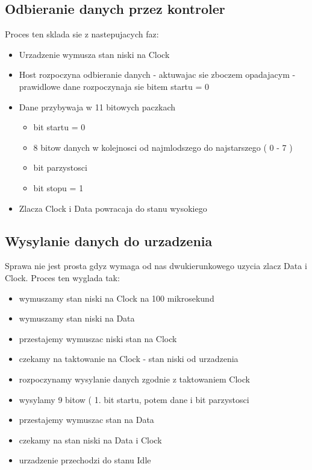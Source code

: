 \documentclass{article}
\begin{document}
	\subsection{Odbieranie danych przez kontroler}
		Proces ten sklada sie z nastepujacych faz:
		\begin{itemize}
			\item{Urzadzenie wymusza stan niski na Clock}
			\item{Host rozpoczyna odbieranie danych - aktuwajac sie zboczem opadajacym} - prawidlowe dane rozpoczynaja sie bitem startu = 0
			\item{Dane przybywaja w 11 bitowych paczkach}
				\begin{itemize}
					\item{bit startu} = 0
					\item{8 bitow danych} w kolejnosci od najmlodszego do najstarszego ( 0 - 7 )
					\item{bit parzystosci}
					\item{bit stopu} = 1 
				\end{itemize}
			\item{Zlacza Clock i Data powracaja do stanu wysokiego}
		\end{itemize}
	\subsection{Wysylanie danych do urzadzenia}
		Sprawa nie jest prosta gdyz wymaga od nas dwukierunkowego uzycia zlacz Data i Clock. Proces ten wyglada tak:
		\begin{itemize}
			\item{wymuszamy stan niski na Clock na 100 mikrosekund }
			\item{wymuszamy stan niski na Data}
			\item{przestajemy wymuszac niski stan na Clock}
			\item{czekamy na taktowanie na Clock} - stan niski od urzadzenia
			\item{rozpoczynamy wysylanie danych zgodnie z taktowaniem Clock}
			\item{wysylamy 9 bitow ( 1. bit startu, potem dane i bit parzystosci}
			\item{przestajemy wymuszac stan na Data}
			\item{czekamy na stan niski na Data i Clock}
			\item{urzadzenie przechodzi do stanu Idle}
		\end{itemize}
\end{document}
